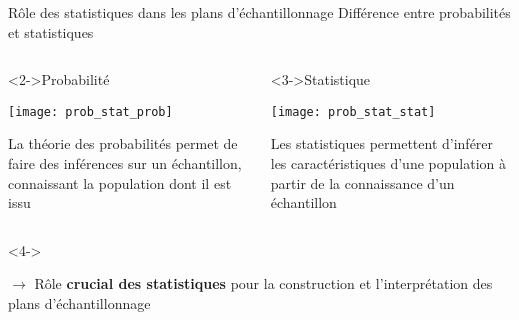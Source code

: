 \message{ !name(cours_DIE_ONIRIS_Suivi_populations_oiseaux.tex)}\documentclass[10pt]{beamer}
\begin{document}
\begin{frame}{Rôle des statistiques dans les plans d’échantillonnage}
  Différence entre probabilités et statistiques
  \begin{columns}[c]
    \begin{column}[c]{0.5\textwidth}
      \begin{block}<2->{Probabilité}
        \begin{center}
          \texttt{[image: prob\_stat\_prob]}
        \end{center}
        \begin{small}
          La théorie des probabilités permet de faire des inférences sur un échantillon, connaissant la population dont il est issu
        \end{small}
      \end{block}
    \end{column}
    \begin{column}[c]{0.5\textwidth}
      \begin{block}<3->{Statistique}
        \begin{center}
          \texttt{[image: prob\_stat\_stat]}
        \end{center}
        \begin{small}
          Les statistiques permettent d’inférer les caractéristiques
          d’une population à partir de la connaissance d’un échantillon
        \end{small}
      \end{block}
    \end{column}
  \end{columns}
  \begin{alertblock}<4->{}
    \begin{center}
      $\rightarrow$ Rôle \textbf{crucial des statistiques} pour la construction et l’interprétation des plans d’échantillonnage   
    \end{center}
  \end{alertblock}
\end{frame}
\end{document}
